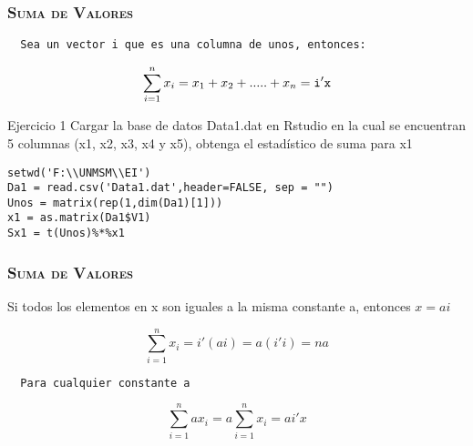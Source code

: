 \documentclass[16.5pt]{beamer}
\begin{document}
{
\begin{frame}
\frametitle{\textsc{\textbf{Suma de Valores}}}
\hspace*{-5mm}
\vspace*{-5mm} 
\vspace{0.5cm}


\texttt{  {\color{blue} Sea un vector i que es una columna de unos, entonces:} }

$$\sum_{i=1}^n x_i = x_1 + x_2 + .....+ x_n = \color{black} \mathtt{i'x}$$



\begin{bclogo}{Ejercicio 1}
 {\small\color{blue} Cargar la base de datos Data1.dat en Rstudio en la cual se encuentran 5 columnas (x1, x2, x3, x4 y x5), obtenga el estadístico de suma para x1}
\begin{lstlisting}
setwd('F:\\UNMSM\\EI')
Da1 = read.csv('Data1.dat',header=FALSE, sep = "")
Unos = matrix(rep(1,dim(Da1)[1]))
x1 = as.matrix(Da1$V1)
Sx1 = t(Unos)%*%x1

\end{lstlisting}
\end{bclogo}

\end{frame}
}

{
\begin{frame}
\frametitle{\textsc{\textbf{Suma de Valores}}}
\hspace*{-5mm}
\vspace*{-5mm} 
\vspace{0.5cm}

{\color{blue} Si todos los elementos en x son iguales a la misma constante a, entonces $x=ai$} 

$$\sum_{i=1}^n x_i = i'(ai) = a(i'i) = na$$

\texttt{  {\color{blue} Para cualquier constante a} }

$$\sum_{i=1}^n a x_i =a\sum_{i=1}^n  x_i= ai'x$$

\end{frame}
}
\end{document}
